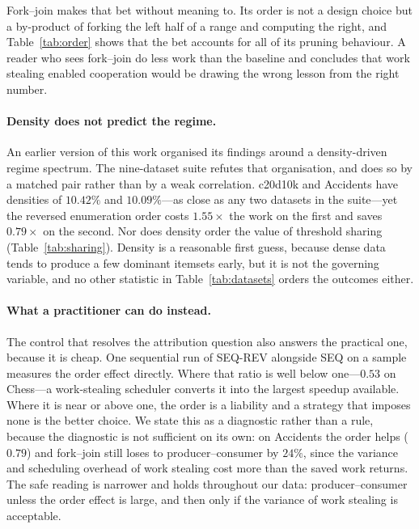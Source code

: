 \documentclass[pdflatex,sn-vancouver-num]{sn-jnl}
\theoremstyle{thmstyleone}%
\theoremstyle{thmstyletwo}%
\theoremstyle{thmstylethree}%
\begin{document}
Fork--join makes that bet without meaning to. Its order is not a design
choice but a by-product of forking the left half of a range and
computing the right, and Table~\ref{tab:order} shows that the bet
accounts for all of its pruning behaviour. A reader who sees fork--join
do less work than the baseline and concludes that work stealing enabled
cooperation would be drawing the wrong lesson from the right number.
 
\paragraph{Density does not predict the regime.}
An earlier version of this work organised its findings around a
density-driven regime spectrum. The nine-dataset suite refutes that
organisation, and does so by a matched pair rather than by a weak
correlation. c20d10k and Accidents have densities of $10.42\%$ and
$10.09\%$---as close as any two datasets in the suite---yet the reversed
enumeration order costs $1.55\times$ the work on the first and saves
$0.79\times$ on the second. Nor does density order the value of
threshold sharing (Table~\ref{tab:sharing}). Density is a reasonable
first guess, because dense data tends to produce a few dominant itemsets
early, but it is not the governing variable, and no other statistic in
Table~\ref{tab:datasets} orders the outcomes either.
 
\paragraph{What a practitioner can do instead.}
The control that resolves the attribution question also answers the
practical one, because it is cheap. One sequential run of SEQ-REV
alongside SEQ on a sample measures the order effect directly. Where that
ratio is well below one---$0.53$ on Chess---a work-stealing scheduler
converts it into the largest speedup available. Where it is near or
above one, the order is a liability and a strategy that imposes none is
the better choice. We state this as a diagnostic rather than a rule,
because the diagnostic is not sufficient on its own: on Accidents the
order helps ($0.79$) and fork--join still loses to producer--consumer by
$24\%$, since the variance and scheduling overhead of work stealing cost
more than the saved work returns. The safe reading is narrower and holds
throughout our data: producer--consumer unless the order effect is
large, and then only if the variance of work stealing is acceptable.
 
\end{document}
